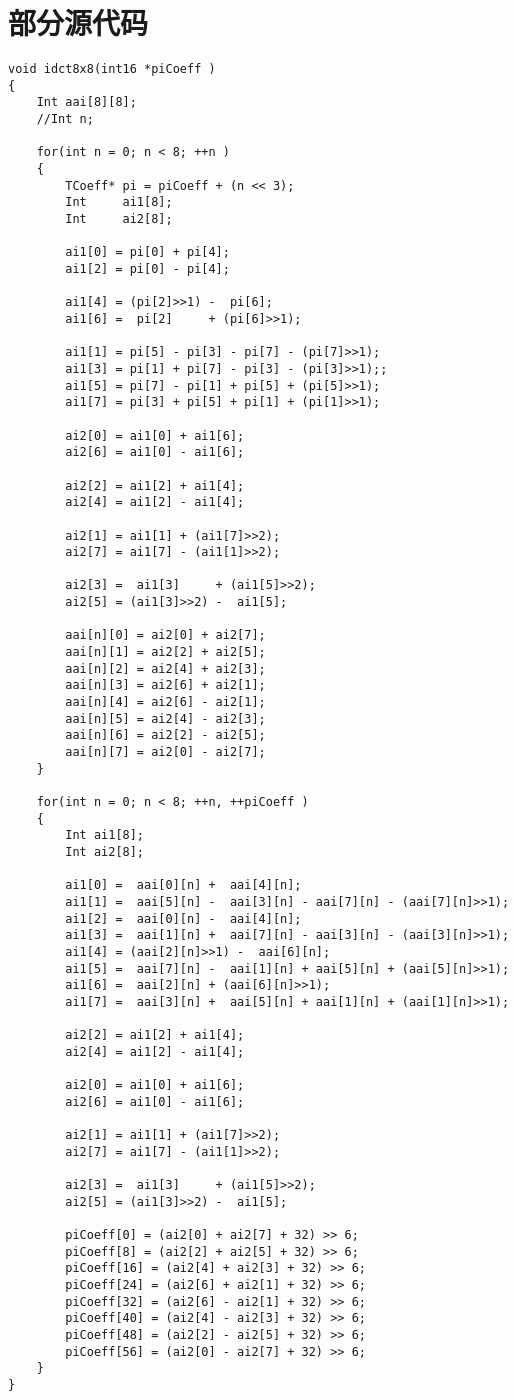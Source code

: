 

\chapter{部分源代码}
\label{cha:sourcecode}

\begin{lstlisting}[caption = {idct8x8（C++实现）}, label = lst:idct8x8c++]
void idct8x8(int16 *piCoeff )
{
	Int aai[8][8];
	//Int n;

	for(int n = 0; n < 8; ++n )
	{
		TCoeff* pi = piCoeff + (n << 3);
		Int     ai1[8];
		Int     ai2[8];

		ai1[0] = pi[0] + pi[4];
		ai1[2] = pi[0] - pi[4];

		ai1[4] = (pi[2]>>1) -  pi[6];
		ai1[6] =  pi[2]     + (pi[6]>>1);

		ai1[1] = pi[5] - pi[3] - pi[7] - (pi[7]>>1);
		ai1[3] = pi[1] + pi[7] - pi[3] - (pi[3]>>1);;
		ai1[5] = pi[7] - pi[1] + pi[5] + (pi[5]>>1);
		ai1[7] = pi[3] + pi[5] + pi[1] + (pi[1]>>1);

		ai2[0] = ai1[0] + ai1[6];
		ai2[6] = ai1[0] - ai1[6];

		ai2[2] = ai1[2] + ai1[4];
		ai2[4] = ai1[2] - ai1[4];

		ai2[1] = ai1[1] + (ai1[7]>>2);
		ai2[7] = ai1[7] - (ai1[1]>>2);

		ai2[3] =  ai1[3]     + (ai1[5]>>2);
		ai2[5] = (ai1[3]>>2) -  ai1[5];

		aai[n][0] = ai2[0] + ai2[7];
		aai[n][1] = ai2[2] + ai2[5];
		aai[n][2] = ai2[4] + ai2[3];
		aai[n][3] = ai2[6] + ai2[1];
		aai[n][4] = ai2[6] - ai2[1];
		aai[n][5] = ai2[4] - ai2[3];
		aai[n][6] = ai2[2] - ai2[5];
		aai[n][7] = ai2[0] - ai2[7];
	}

	for(int n = 0; n < 8; ++n, ++piCoeff )
	{
		Int ai1[8];
		Int ai2[8];

		ai1[0] =  aai[0][n] +  aai[4][n];
		ai1[1] =  aai[5][n] -  aai[3][n] - aai[7][n] - (aai[7][n]>>1);
		ai1[2] =  aai[0][n] -  aai[4][n];
		ai1[3] =  aai[1][n] +  aai[7][n] - aai[3][n] - (aai[3][n]>>1);
		ai1[4] = (aai[2][n]>>1) -  aai[6][n];
		ai1[5] =  aai[7][n] -  aai[1][n] + aai[5][n] + (aai[5][n]>>1);
		ai1[6] =  aai[2][n] + (aai[6][n]>>1);
		ai1[7] =  aai[3][n] +  aai[5][n] + aai[1][n] + (aai[1][n]>>1);

		ai2[2] = ai1[2] + ai1[4];
		ai2[4] = ai1[2] - ai1[4];

		ai2[0] = ai1[0] + ai1[6];
		ai2[6] = ai1[0] - ai1[6];

		ai2[1] = ai1[1] + (ai1[7]>>2);
		ai2[7] = ai1[7] - (ai1[1]>>2);

		ai2[3] =  ai1[3]     + (ai1[5]>>2);
		ai2[5] = (ai1[3]>>2) -  ai1[5];

		piCoeff[0] = (ai2[0] + ai2[7] + 32) >> 6;
		piCoeff[8] = (ai2[2] + ai2[5] + 32) >> 6;
		piCoeff[16] = (ai2[4] + ai2[3] + 32) >> 6;
		piCoeff[24] = (ai2[6] + ai2[1] + 32) >> 6;
		piCoeff[32] = (ai2[6] - ai2[1] + 32) >> 6;
		piCoeff[40] = (ai2[4] - ai2[3] + 32) >> 6;
		piCoeff[48] = (ai2[2] - ai2[5] + 32) >> 6;
		piCoeff[56] = (ai2[0] - ai2[7] + 32) >> 6;
	}
}
\end{lstlisting}


